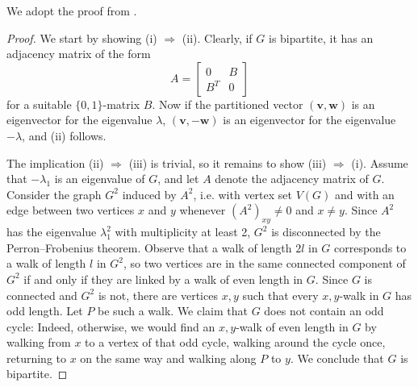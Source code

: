 We adopt the proof from \cite[Theorem 8.8.2]{godsilroyle}.
\begin{proof}
    We start by showing (i) $\Rightarrow$ (ii).
    Clearly, if $G$ is bipartite, it has an adjacency matrix of the form 
    \begin{equation*}
        A = \begin{bmatrix} 
                  0 & B \\ 
                  B^T & 0
                \end{bmatrix}
    \end{equation*}
    for a suitable $\{ 0, 1\}$-matrix $B$. Now if the partitioned vector $(\bm{v}, \bm{w})$ is an eigenvector for the eigenvalue $\lambda$, $(\bm{v}, -\bm{w})$ is an eigenvector for the eigenvalue $-\lambda$, and (ii) follows.

    The implication (ii) $\Rightarrow$ (iii) is trivial, so it remains to show (iii) $\Rightarrow$ (i).
    Assume that $-\lambda_1$ is an eigenvalue of $G$, and let $A$ denote the adjacency matrix of $G$.
    Consider the graph $G^2$ induced by $A^2$, i.e. with vertex set $V(G)$ and with an edge between two vertices $x$ and $y$ whenever $(A^2)_{xy} \ne 0$ and $x \ne y$.
    Since $A^2$ has the eigenvalue $\lambda_1 ^2$ with multiplicity at least 2, $G^2$ is disconnected by the Perron--Frobenius theorem.
    Observe that a walk of length $2l$ in $G$ corresponds to a walk of length $l$ in $G^2$, 
    so two vertices are in the same connected component of $G^2$ if and only if they are linked by a walk of even length in $G$.
    Since $G$ is connected and $G^2$ is not, there are vertices $x, y$ such that every $x, y$-walk in $G$ has odd length. 
    Let $P$ be such a walk. 
    We claim that $G$ does not contain an odd cycle:
    Indeed, otherwise, we would find an $x, y$-walk of even length in $G$ by walking from $x$ to a vertex of that odd cycle, walking around the cycle once, returning to $x$ on the same way and walking along $P$ to $y$. 
    We conclude that $G$ is bipartite.
\end{proof}
